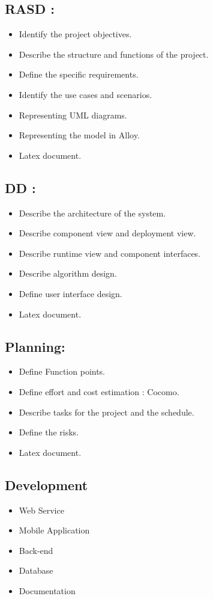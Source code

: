 \documentclass[11pt, a4paper,titlepage]{article}
\begin{document}
	\subsection{RASD :}
	\begin{itemize}
		\item Identify the project objectives.
		\item Describe the structure and functions of the project.
		\item Define the specific requirements.
		\item Identify the use cases and scenarios.
		\item Representing UML diagrams.
		\item Representing the model in Alloy.
		\item Latex document.
	\end{itemize}

	\subsection{DD :}
	\begin{itemize}
		\item Describe the architecture of the system.
		\item Describe component view and deployment view.
		\item Describe runtime view and component interfaces.
		\item Describe algorithm design.
		\item Define user interface design.
		\item Latex document.
	\end{itemize}
	
	\subsection{Planning:}
	\begin{itemize}
		\item Define Function points.
		\item Define effort and cost estimation : Cocomo.
		\item Describe tasks for the project and the schedule.
		\item Define the risks.
		\item Latex document.
	\end{itemize}
	
	\subsection{Development}
	\begin{itemize}
		\item Web Service
		\item Mobile Application
		\item Back-end
		\item Database
		\item Documentation
	\end{itemize}
	
\end{document}
